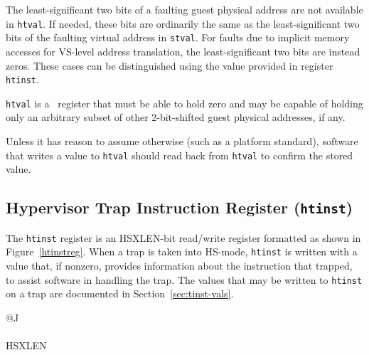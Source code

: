 \begin{commentary}
The least-significant two bits of a faulting guest physical address are
not available in {\tt htval}.
If needed, these bits are ordinarily the same as the least-significant
two bits of the faulting virtual address in {\tt stval}.
For faults due to implicit memory accesses for VS-level address
translation, the least-significant two bits are instead zeros.
These cases can be distinguished using the value provided in register
{\tt htinst}.
\end{commentary}

{\tt htval} is a \warl\ register that must be able to hold zero and may
be capable of holding only an arbitrary subset of other 2-bit-shifted
guest physical addresses, if any.

\begin{commentary}
Unless it has reason to assume otherwise (such as a platform standard),
software that writes a value to {\tt htval} should read back from
{\tt htval} to confirm the stored value.
\end{commentary}

\subsection{Hypervisor Trap Instruction Register ({\tt htinst})}

The {\tt htinst} register is an HSXLEN-bit read/write register formatted
as shown in Figure~\ref{htinstreg}.
When a trap is taken into HS-mode, {\tt htinst} is written with a value
that, if nonzero, provides information about the instruction that
trapped, to assist software in handling the trap.
The values that may be written to {\tt htinst} on a trap are documented
in Section~\ref{sec:tinst-vals}.

\begin{figure*}[h!]
{\footnotesize
\begin{center}
\begin{tabular}{@{}J}
 \\
\hline
{} \\
\hline
HSXLEN \\
\end{tabular}
\end{center}
}
\vspace{-0.1in}
\caption{Hypervisor trap instruction register ({\tt htinst}).}
\label{htinstreg}
\end{figure*}

